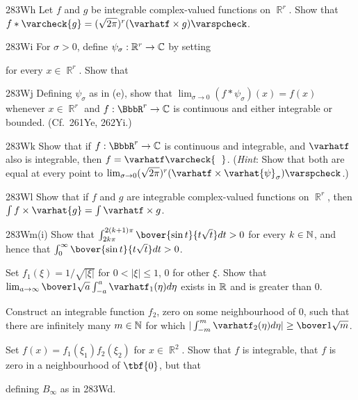 {\spheader 283Wh Let $f$ and $g$ be integrable complex-valued
functions on $\BbbR^r$.   Show that
$f*\varcheck{g}=(\sqrt{2\pi})^r(\varhatf\times g)\varspcheck$.

\spheader 283Wi For $\sigma>0$, define
$\psi_{\sigma}:\Bbb R^r\to\Bbb C$ by setting


\noindent for every $x\in\BbbR^r$.   Show that


\spheader 283Wj Defining $\psi_{\sigma}$ as in (e), show that
$\lim_{\sigma\to 0}(f*\psi_{\sigma})(x)=f(x)$ whenever $x\in\BbbR^r$ and
$f:\BbbR^r\to\Bbb C$ is continuous and either integrable or bounded.
(Cf.\ 261Ye, 262Yi.)

\spheader 283Wk Show that if $f:\BbbR^r\to\Bbb C$ is continuous
and integrable, and $\varhatf$ also is integrable, then
$f=\varhatf\varcheck{\phantom{f}}$.
({\it Hint\/}:  Show that both are equal at every point to
$\lim_{\sigma\to 0}(\sqrt{2\pi})^r
  (\varhatf\times\varhat{\psi}_{\sigma})\varspcheck$.)

\spheader 283Wl Show that if $f$ and $g$ are integrable
complex-valued functions on $\BbbR^r$, then $\int
f\times\varhat{g}=\int\varhatf\times g$.

\spheader 283Wm(i) Show that
$\int_{2k\pi}^{2(k+1)\pi}\bover{\sin t}{t\sqrt{t}}dt>0$ for every
$k\in\Bbb N$, and hence that
$\int_0^{\infty}\bover{\sin t}{t\sqrt{t}}dt>0$.

 Set $f_1(\xi)=1/\sqrt{|\xi|}$ for $0<|\xi|\le 1$, $0$ for
other $\xi$.   Show that
$\lim_{a\to\infty}\bover1{\sqrt{a}}\int_{-a}^a\varhatf_1(\eta)d\eta$
exists in $\Bbb R$ and is greater than $0$.

 Construct an integrable function $f_2$, zero on some
neighbourhood of $0$, such that there are infinitely many $m\in\Bbb N$
for which $|\int_{-m}^m\varhatf_2(\eta)d\eta|\ge\bover1{\sqrt{m}}$.

 Set $f(x)=f_1(\xi_1)f_2(\xi_2)$ for $x\in\BbbR^2$.   Show
that $f$ is integrable, that $f$ is zero in a neighbourhood of
$\tbf{0}$, but that


\noindent defining $B_{\infty}$ as in 283Wd.
}%

